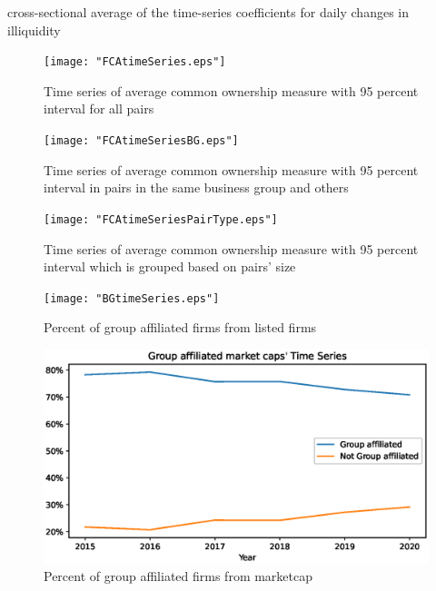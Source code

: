 \documentclass[12pt, a4paper]{article}
\begin{document}
	\begin{table}[htbp]
	\centering
	\caption{cross-sectional average of the time-series coefficients for daily changes in illiquidity  }
	\resizebox{0.7\textheight}{!}{
		\centering
		
	}
\end{table}

\newpage
		\begin{figure}
	\centering  
	\caption{Time series of average common ownership measure with 95 percent interval for all pairs}
	\texttt{[image: "FCAtimeSeries.eps"]}
	
\end{figure} 

			\begin{figure}
	\centering  
	\caption{Time series of average common ownership measure with 95 percent interval in pairs in the same business group and others}
	\texttt{[image: "FCAtimeSeriesBG.eps"]}
\end{figure}    

\begin{figure}
	\centering  
	\caption{Time series of average common ownership measure with 95 percent interval which is grouped based on pairs' size}
	\texttt{[image: "FCAtimeSeriesPairType.eps"]}
\end{figure}




	\begin{figure}
	\centering  
	\caption{Percent of group affiliated firms from listed firms}
	\texttt{[image: "BGtimeSeries.eps"]}
	
\end{figure}  

\begin{figure}
	\centering  
	\caption{Percent of group affiliated firms from marketcap}
	\includegraphics[width=\linewidth]{"BGMarketCaptimeSeries.eps"}
	
\end{figure}
 
%
\end{document}
